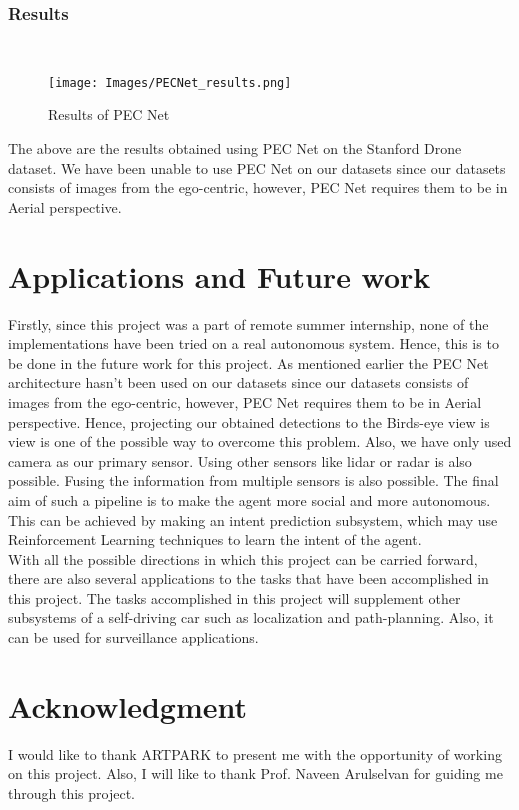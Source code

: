 \documentclass[conference]{IEEEtran}
\begin{document}
\subsubsection*{\textbf{Results}} \\
\begin{figure}[H]
  \centering
  \texttt{[image: Images/PECNet\_results.png]}
  \caption{Results of PEC Net}
\end{figure}
The above are the results obtained using PEC Net on the Stanford Drone dataset. We have been unable to use PEC Net on our datasets since our datasets consists of images from the ego-centric, however, PEC Net requires them to be in Aerial perspective.

\section{Applications and Future work}
Firstly, since this project was a part of remote summer internship, none of the implementations have been tried on a real autonomous system. Hence, this is to be done in the future work for this project. As mentioned earlier the PEC Net architecture hasn't been used on our datasets since our datasets consists of images from the ego-centric, however, PEC Net requires them to be in Aerial perspective. Hence, projecting our obtained detections to the Birds-eye view is view is one of the possible way to overcome this problem. Also, we have only used camera as our primary sensor. Using other sensors like lidar or radar is also possible. Fusing the information from multiple sensors is also possible. The final aim of such a pipeline is to make the agent more social and more autonomous. This can be achieved by making an intent prediction subsystem, which may use Reinforcement Learning techniques to learn the intent of the agent. \\
With all the possible directions in which this project can be carried forward, there are also several applications to the tasks that have been accomplished in this project. The tasks accomplished in this project will supplement other subsystems of a self-driving car such as localization and path-planning. Also, it can be used for surveillance applications. \\



\section{Acknowledgment}
I would like to thank ARTPARK to present me with the opportunity of working on this project. Also, I will like to thank Prof. Naveen Arulselvan for guiding me through this project.




\end{document}
